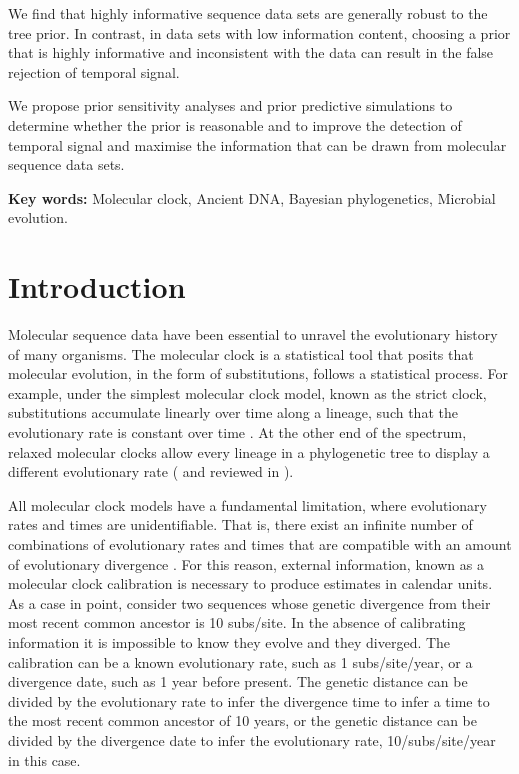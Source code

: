 \documentclass[11pt]{article}
\begin{document}
We find that highly informative sequence data sets are generally robust to the tree prior. In contrast, in data sets with low information content, choosing a prior that is highly informative and inconsistent with the data can result in the false rejection of temporal signal. 

We propose prior sensitivity analyses and prior predictive simulations to determine whether the prior is reasonable and to improve the detection of temporal signal and maximise the information that can be drawn from molecular sequence data sets.

\textbf{Key words:} Molecular clock, Ancient DNA, Bayesian phylogenetics, Microbial evolution.

\section{Introduction}
Molecular sequence data have been essential to unravel the evolutionary history of many organisms. The molecular clock is a statistical tool that posits that molecular evolution, in the form of substitutions, follows a statistical process. For example, under the simplest molecular clock model, known as the strict clock, substitutions accumulate linearly over time along a lineage, such that the evolutionary rate is constant over time \citep{zuckerkandl1965evolutionary}. At the other end of the spectrum, relaxed molecular clocks allow every lineage in a phylogenetic tree to display a different evolutionary rate (\cite{drummond2006relaxed} and reviewed in \citep{ho2014molecular}). 

All molecular clock models have a fundamental limitation, where evolutionary rates and times are unidentifiable. That is, there exist an infinite number of combinations of evolutionary rates and times that are compatible with an amount of evolutionary divergence \cite{yang2006bayesian,dos2013unbearable}. For this reason, external information, known as a molecular clock calibration is necessary to produce estimates in calendar units. As a case in point, consider two sequences whose genetic divergence from their most recent common ancestor is 10 subs/site. In the absence of calibrating information it is impossible to know  they evolve and  they diverged. The calibration can be a known evolutionary rate, such as 1 subs/site/year, or a divergence date, such as 1 year before present. The genetic distance can be divided by the evolutionary rate to infer the divergence time to infer a time to the most recent common ancestor of 10 years, or the genetic distance can be divided by the divergence date to infer the evolutionary rate, 10/subs/site/year in this case.
\end{document}
